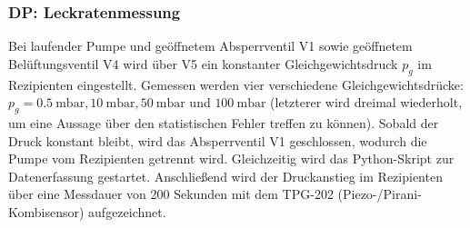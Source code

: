 \subsubsection{DP: Leckratenmessung}
Bei laufender Pumpe und geöffnetem Absperrventil V1 sowie geöffnetem 
Belüftungsventil V4 wird über V5 ein konstanter Gleichgewichtsdruck $p_g$ im
Rezipienten eingestellt. Gemessen werden vier verschiedene Gleichgewichtsdrücke:
$p_g = \qty{0,5}{\milli\bar}, \qty{10}{\milli\bar}, \qty{50}{\milli\bar}$ und 
$\qty{100}{\milli\bar}$ (letzterer wird dreimal wiederholt, um eine Aussage über
den statistischen Fehler treffen zu können). Sobald der Druck konstant bleibt,
wird das Absperrventil V1 geschlossen, wodurch die Pumpe vom Rezipienten getrennt
wird. Gleichzeitig wird das Python-Skript zur Datenerfassung gestartet. Anschließend
wird der Druckanstieg im Rezipienten über eine Messdauer von 200 Sekunden mit
dem TPG-202 (Piezo-/Pirani-Kombisensor) aufgezeichnet. \cite{glossar}